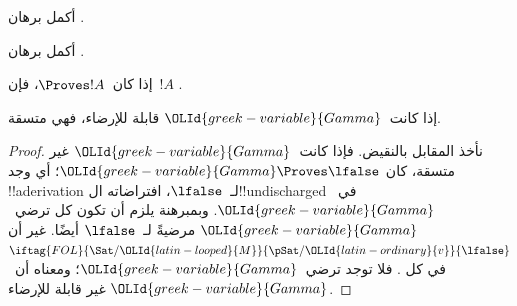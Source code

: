 \documentclass[../../../include/open-logic-section]{subfiles}
\begin{document}
\begin{prob}
أكمل برهان .
\end{prob}
\tagendprob

\begin{prob}
أكمل برهان .
\end{prob}
\tagendprob

\begin{cor}
إذا كان~$\Proves !A$، فإن~$!A$ .
\end{cor}

\begin{cor}
إذا كانت~${\OLId{greek-variable}{Gamma}}$ قابلة للإرضاء، فهي متسقة.
\end{cor}

\begin{proof}
نأخذ المقابل بالنقيض. فإذا كانت~${\OLId{greek-variable}{Gamma}}$ غير متسقة، كان
${\OLId{greek-variable}{Gamma}} \Proves \lfalse$؛ أي وجد !!a{derivation} لـ~$\lfalse$،
افتراضاته ال!!{undischarged} في~${\OLId{greek-variable}{Gamma}}$. وبمبرهنة
 يلزم أن تكون كل
ترضي~${\OLId{greek-variable}{Gamma}}$ مرضيةً لـ~$\lfalse$ أيضًا. غير أن
$\iftag{FOL}{\Sat/{{\OLId{latin-looped}{M}}}}{\pSat/{{\OLId{latin-ordinary}{v}}}}{\lfalse}$ في كل
.
فلا توجد  ترضي~${\OLId{greek-variable}{Gamma}}$؛
ومعناه أن~${\OLId{greek-variable}{Gamma}}$ غير قابلة للإرضاء.
\end{proof}
\end{document}
